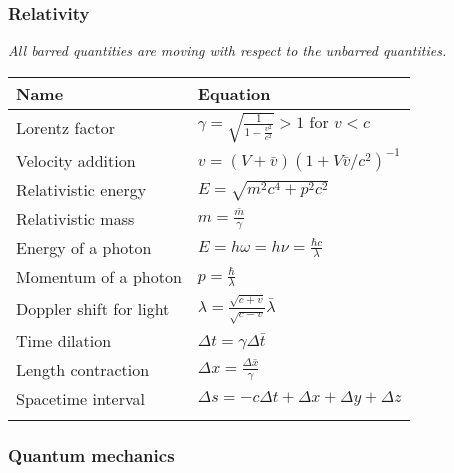 \documentclass[11pt]{paper}
\begin{document}
\subsubsection*{Relativity}
\label{subsec:rel}
\emph{All barred quantities are moving with respect to the unbarred quantities.}
\centering
\label{my-label}
\bgroup
\def\arraystretch{2}
\begin{longtable}{ll}
\textbf{Name}       & \textbf{Equation}          \\ \hline
\multicolumn{1}{|l|}{Lorentz factor} & \multicolumn{1}{l|}{$\gamma = \sqrt{\frac{1}{1-\frac{v^2}{c^2}}}>1 \text{ for }v<c$} \\ \hline
\multicolumn{1}{|l|}{Velocity addition} & \multicolumn{1}{l|}{$v = \left(V+\bar{v}\right)\left(1+V\bar{v}/c^2\right)^{-1}$} \\ \hline
\multicolumn{1}{|l|}{Relativistic energy} & \multicolumn{1}{l|}{$E = \sqrt{m^2c^4 + p^2c^2}$} \\ \hline
\multicolumn{1}{|l|}{Relativistic mass} & \multicolumn{1}{l|}{$m = \frac{\bar{m}}{\gamma}$} \\ \hline
\multicolumn{1}{|l|}{Energy of a photon} & \multicolumn{1}{l|}{$E = h\omega = h\nu = \frac{\hbar c}{\lambda}$} \\ \hline

\multicolumn{1}{|l|}{Momentum of a photon} & \multicolumn{1}{l|}{$p = \frac{\hbar}{\lambda}$} \\ \hline
\multicolumn{1}{|l|}{Doppler shift for light} & \multicolumn{1}{l|}{$\lambda = \frac{\sqrt{c+v}}{\sqrt{c-v}}\bar{\lambda}$} \\ \hline
\multicolumn{1}{|l|}{Time dilation} & \multicolumn{1}{l|}{$\Delta t = \gamma \Delta \bar{t}$} \\ \hline
\multicolumn{1}{|l|}{Length contraction} & \multicolumn{1}{l|}{$\Delta x = \frac{\Delta \bar{x}}{\gamma}$} \\ \hline
\multicolumn{1}{|l|}{Spacetime interval} & \multicolumn{1}{l|}{$\Delta s = -c \Delta t + \Delta x + \Delta y + \Delta z$} \\ \hline\\


\end{longtable}
\newpage

\subsubsection*{Quantum mechanics}
\label{subsec:qm}
\end{document}
